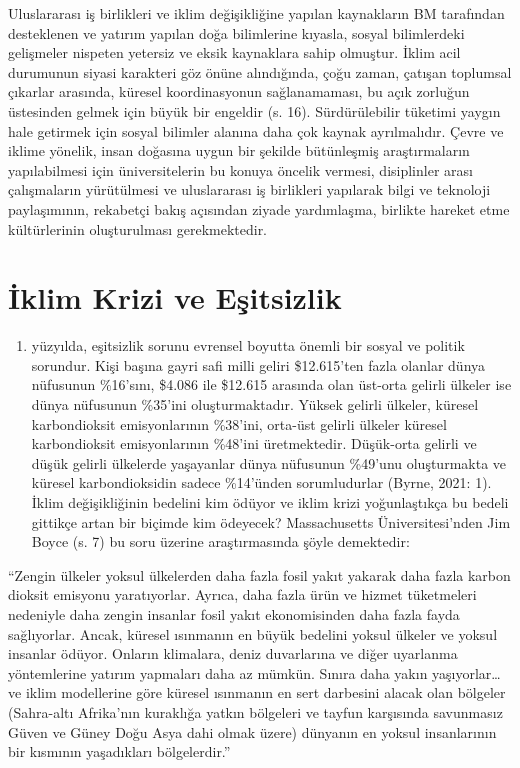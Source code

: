 \documentclass[
]{book}
\providecommand{\tightlist}{%
  \setlength{\itemsep}{0pt}\setlength{\parskip}{0pt}}
\begin{document}
Uluslararası iş birlikleri ve iklim değişikliğine yapılan kaynakların BM tarafından desteklenen ve yatırım yapılan doğa bilimlerine kıyasla, sosyal bilimlerdeki gelişmeler nispeten yetersiz ve eksik kaynaklara sahip olmuştur. İklim acil durumunun siyasi karakteri göz önüne alındığında, çoğu zaman, çatışan toplumsal çıkarlar arasında, küresel koordinasyonun sağlanamaması, bu açık zorluğun üstesinden gelmek için büyük bir engeldir (s. 16).\citep{harvey2016climate} Sürdürülebilir tüketimi yaygın hale getirmek için sosyal bilimler alanına daha çok kaynak ayrılmalıdır. Çevre ve iklime yönelik, insan doğasına uygun bir şekilde bütünleşmiş araştırmaların yapılabilmesi için üniversitelerin bu konuya öncelik vermesi, disiplinler arası çalışmaların yürütülmesi ve uluslararası iş birlikleri yapılarak bilgi ve teknoloji paylaşımının, rekabetçi bakış açısından ziyade yardımlaşma, birlikte hareket etme kültürlerinin oluşturulması gerekmektedir.

\hypertarget{iklim-krizi-ve-eux15fitsizlik}{%
\section{İklim Krizi ve Eşitsizlik}\label{iklim-krizi-ve-eux15fitsizlik}}

\begin{enumerate}
\def\labelenumi{\arabic{enumi}.}
\setcounter{enumi}{20}
\tightlist
\item
  yüzyılda, eşitsizlik sorunu evrensel boyutta önemli bir sosyal ve politik sorundur. Kişi başına gayri safi milli geliri \$12.615'ten fazla olanlar dünya nüfusunun \%16'sını, \$4.086 ile \$12.615 arasında olan üst-orta gelirli ülkeler ise dünya nüfusunun \%35'ini oluşturmaktadır. Yüksek gelirli ülkeler, küresel karbondioksit emisyonlarının \%38'ini, orta-üst gelirli ülkeler küresel karbondioksit emisyonlarının \%48'ini üretmektedir. Düşük-orta gelirli ve düşük gelirli ülkelerde yaşayanlar dünya nüfusunun \%49'unu oluşturmakta ve küresel karbondioksidin sadece \%14'ünden sorumludurlar (Byrne, 2021: 1). İklim değişikliğinin bedelini kim ödüyor ve iklim krizi yoğunlaştıkça bu bedeli gittikçe artan bir biçimde kim ödeyecek? Massachusetts Üniversitesi'nden Jim Boyce (s. 7) \citep{boyce2019economics} bu soru üzerine araştırmasında şöyle demektedir:
\end{enumerate}

``Zengin ülkeler yoksul ülkelerden daha fazla fosil yakıt yakarak daha fazla karbon dioksit emisyonu yaratıyorlar. Ayrıca, daha fazla ürün ve hizmet tüketmeleri nedeniyle daha zengin insanlar fosil yakıt ekonomisinden daha fazla fayda sağlıyorlar. Ancak, küresel ısınmanın en büyük bedelini yoksul ülkeler ve yoksul insanlar ödüyor. Onların klimalara, deniz duvarlarına ve diğer uyarlanma yöntemlerine yatırım yapmaları daha az mümkün. Sınıra daha yakın yaşıyorlar\ldots{} ve iklim modellerine göre küresel ısınmanın en sert darbesini alacak olan bölgeler (Sahra-altı Afrika'nın kuraklığa yatkın bölgeleri ve tayfun karşısında savunmasız Güven ve Güney Doğu Asya dahi olmak üzere) dünyanın en yoksul insanlarının bir kısmının yaşadıkları bölgelerdir.''
\end{document}

